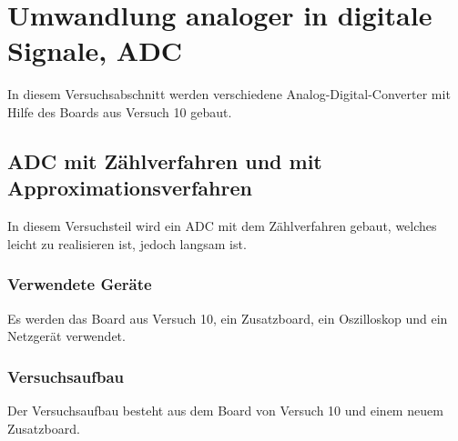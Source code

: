 \documentclass[12pt,a4paper]{article}
\begin{document}
\section{Umwandlung analoger in digitale Signale, ADC}

In diesem Versuchsabschnitt werden verschiedene Analog-Digital-Converter mit Hilfe des Boards aus Versuch 10 gebaut.

\subsection{ADC mit Zählverfahren und mit Approximationsverfahren}

In diesem Versuchsteil wird ein ADC mit dem Zählverfahren gebaut, welches leicht zu realisieren ist, jedoch langsam ist.

\subsubsection*{Verwendete Geräte}

Es werden das Board aus Versuch 10, ein Zusatzboard, ein Oszilloskop und ein Netzgerät verwendet.


\subsubsection*{Versuchsaufbau}

Der Versuchsaufbau besteht aus dem Board von Versuch 10 und einem neuem Zusatzboard.
\end{document}
